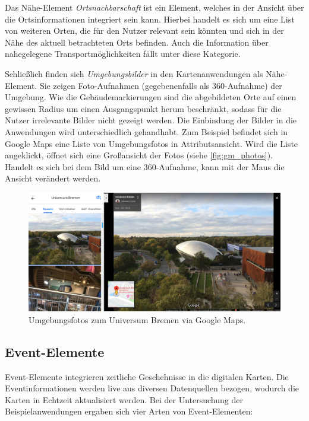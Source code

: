 Das Nähe-Element \emph{Ortsnachbarschaft} ist ein Element, welches in der Ansicht über die Ortsinformationen integriert sein kann.
Hierbei handelt es sich um eine List von weiteren Orten, die für den Nutzer relevant sein könnten und sich in der Nähe des aktuell betrachteten Orts befinden.
Auch die Information über nahegelegene Transportmöglichkeiten fällt unter diese Kategorie.

Schließlich finden sich \emph{Umgebungsbilder} in den Kartenanwendungen als Nähe-Element.
Sie zeigen Foto-Aufnahmen (gegebenenfalls als 360\textdegree-Aufnahme) der Umgebung.
Wie die Gebäudemarkierungen sind die abgebildeten Orte auf einen gewissen Radius um einen Ausgangspunkt herum beschränkt, sodass für die Nutzer irrelevante Bilder nicht gezeigt werden.
Die Einbindung der Bilder in die Anwendungen wird unterschiedlich gehandhabt.
Zum Beispiel befindet sich in Google Maps eine Liste von Umgebungsfotos in Attributsansicht.
Wird die Liste angeklickt, öffnet sich eine Großansicht der Fotos (siehe \autoref{fig:gm_photos}).
Handelt es sich bei dem Bild um eine 360\textdegree-Aufnahme, kann mit der Maus die Ansicht verändert werden.
\begin{figure}[h]
	\centering
	\includegraphics[width=\linewidth]{figures/map-app_examples/gm_photos_2}
	\caption{Umgebungsfotos zum Universum Bremen via Google Maps.}
	\label{fig:gm_photos}
\end{figure}

\subsection{Event-Elemente}
\label{ssec:event-elements}
Event-Elemente integrieren zeitliche Geschehnisse in die digitalen Karten.
Die Eventinformationen werden live aus diversen Datenquellen bezogen, wodurch die Karten in Echtzeit aktualisiert werden.
Bei der Untersuchung der Beispielanwendungen ergaben sich vier Arten von Event-Elementen:

